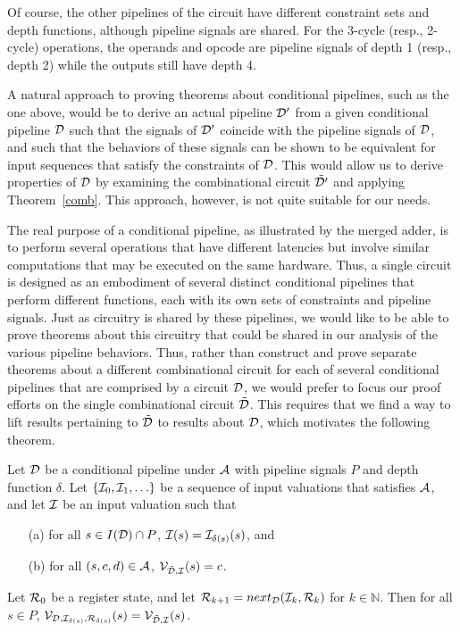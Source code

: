 \documentclass{article}
\begin{document}
Of course, the other pipelines of the circuit have different
constraint sets and depth functions, although pipeline signals are
shared.  For the 3-cycle (resp., 2-cycle) operations, the operands and
opcode are pipeline signals of depth 1 (resp., depth 2) while the
outputs still have depth 4.

A natural approach to proving theorems about conditional pipelines,
such as the one above, would be to derive an actual pipeline ${\cal
D}'$ from a given conditional pipeline ${\cal D}$ such that the
signals of ${\cal D}'$ coincide with the pipeline signals of ${\cal
D}$, and such that the behaviors of these signals can be shown to be
equivalent for input sequences that satisfy the constraints of ${\cal
D}$.  This would allow us to derive properties of ${\cal D}$ by
examining the combinational circuit $\tilde{{\cal D}'}$ and applying
Theorem~\ref{comb}.  This approach, however, is not quite suitable for
our needs.

The real purpose of a conditional pipeline, as illustrated by the
merged adder, is to perform several operations that have different
latencies but involve similar computations that may be executed on the
same hardware.  Thus, a single circuit is designed as an embodiment of
several distinct conditional pipelines that perform different
functions, each with its own sets of constraints and pipeline signals.
Just as circuitry is shared by these pipelines, we would like to be
able to prove theorems about this circuitry that could be shared in
our analysis of the various pipeline behaviors.  Thus, rather than
construct and prove separate theorems about a different combinational
circuit for each of several conditional pipelines that are comprised
by a circuit ${\cal D}$, we would prefer to focus our proof efforts on
the single combinational circuit $\tilde{\cal D}$.  This requires that
we find a way to lift results pertaining to $\tilde{\cal D}$ to
results about ${\cal D}$, which motivates the following theorem.

\begin{theorem}\label{pipe}
Let ${\cal D}$ be a conditional pipeline under ${\cal A}$ with
pipeline signals $P$ and depth function $\delta$.  Let $\{{\cal
I}_0,{\cal I}_1,\ldots\}$ be a sequence of input valuations that
satisfies ${\cal A}$, and let ${\cal I}$ be an input valuation such
that

\begin{itemize}

\item[(a)] for all $s \in I({\cal D}) \cap P$, ${\cal I}(s) = {\cal I}_{\delta(s)}(s)$, and

\item[(b)] for all $(s,c,d) \in {\cal A}$, ${\cal V}_{\tilde{\cal D},{\cal I}}(s) = c$.

\end{itemize}
Let ${\cal R}_0$ be a register state, and let ${\cal R}_{k+1} =
next_{\cal D}({\cal I}_k,{\cal R}_k)$ for $k \in {\mathbb N}$.  Then
for all $s \in P$, ${\cal V}_{{\cal D},{\cal I}_{\delta(s)},{\cal
R}_{\delta(s)}}(s) = {\cal V}_{\tilde{\cal D},{\cal I}}(s)$.
\end{theorem}
\end{document}
